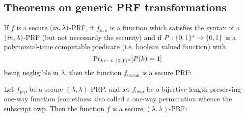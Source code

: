 \subsection{Theorems on generic PRF transformations}
\begin{theorem}\label{thm:PRF-negl-mod}
If $f$ is a secure $(\mathit{in},\lambda)$-PRF, if $f_{\text{bad}}$ is a function which satisfies the 
syntax of a $(\mathit{in},\lambda)$-PRF
(but not necessarily the security) and if $P:\{0,1\}^*\rightarrow\{0,1\}$ is a polynomial-time computable predicate (i.e. boolean valued function) with
\[\probsub{k\sample\bin^\lambda}{P(k)=1}\]
being negligible in $\lambda$, then the function $f_{\text{tweak}}$ is a secure PRF:
\begin{center}
\begin{pchstack}
\end{pchstack}
\end{center}
\end{theorem}

\begin{theorem}
Let $f_{\text{prp}}$ be a secure $(\lambda,\lambda)$-PRP, and let $f_{\text{owp}}$ be a bijective length-preserving
one-way function (sometimes also called a one-way permutation whence the subscript $\text{owp}$.
Then the function $f$ is a secure $(\lambda,\lambda)$-PRF:
\begin{center}
\begin{pchstack}
\end{pchstack}
\end{center}
\end{theorem}

